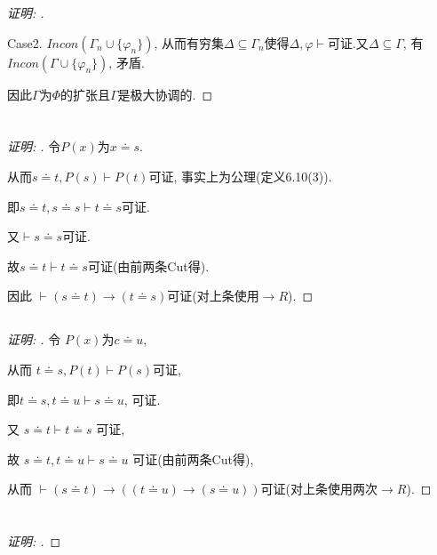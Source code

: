 \documentclass{article}
\begin{document}
\begin{CJK*}{UTF8}{gbsn}
\begin{samepage}
\begin{proof}[\emph{证明: }]
\begin{enumerate}[(1)]
Case2. $Incon(\Gamma_n \cup \{\varphi_n\})$, 从而有穷集$\Delta \subseteq \Gamma_n$使得$\Delta, \varphi \vdash$可证.又$\Delta \subseteq \Gamma$, 有$Incon(\Gamma \cup \{\varphi_n\})$, 矛盾.
\end{enumerate}

因此$\Gamma$为$\Phi$的扩张且$\Gamma$是极大协调的.
\end{proof}
\end{samepage}

\section{}

\subsection{}
\begin{proof}[\emph{证明: }]

令$P(x)$为$x \doteq s$.

从而$s \doteq t , P(s) \vdash P(t)$可证, 事实上为公理(定义6.10(3)).

即$s \doteq t , s\doteq s \vdash t\doteq s$可证. 

又$\vdash s\doteq s$可证.

故$s\doteq t \vdash t\doteq s$可证(由前两条Cut得). 

因此 $\vdash (s\doteq t )\rightarrow (t \doteq s)$可证(对上条使用$\rightarrow R$). 
\end{proof}

\subsection{}
\begin{proof}[\emph{证明: }]

令 $P(x)$为$c \doteq u$, 

从而
$t\doteq s , P(t) \vdash P(s)$可证, 

即$t\doteq s , t \doteq u \vdash s\doteq u$, 可证. 

又 $s \doteq t \vdash t \doteq s$ 可证,

故 $s\doteq t , t \doteq u \vdash s\doteq u$ 可证(由前两条Cut得), 

从而
$\vdash (s \doteq t)\rightarrow ((t \doteq u)\rightarrow(s\doteq u))$可证(对上条使用两次$\rightarrow R$). 
\end{proof}
\section{}
\begin{proof}[\emph{证明: }]


\end{proof}
\end{CJK*}
\end{document}
